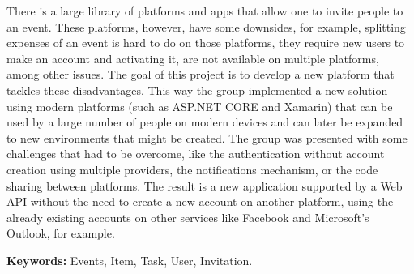 



\vspace{3em}

\noindent

There is a large library of platforms and apps that allow one to invite people to an event. These platforms, however, have some downsides, for example, splitting expenses of an event is hard to do on those platforms, they require new users to make an account and activating it, are not available on multiple platforms, among other issues. The goal of this project is to develop a new platform that tackles these disadvantages. This way the group implemented a new solution using modern platforms (such as ASP.NET CORE and Xamarin) that can be used by a large number of people on modern devices and can later be expanded to new environments that might be created. The group was presented with some challenges that had to be overcome, like the authentication without account creation using multiple providers, the notifications mechanism, or the code sharing between platforms. The result is a new application supported by a Web API without the need to create a new account on another platform, using the already existing accounts on other services like Facebook and Microsoft’s Outlook, for example.


\vspace*{1em}

\textbf{\large{Keywords:}} Events, Item, Task, User, Invitation.


%	
%	
%	

%
%
%
%
%
%
%
%
%
%
%
%





